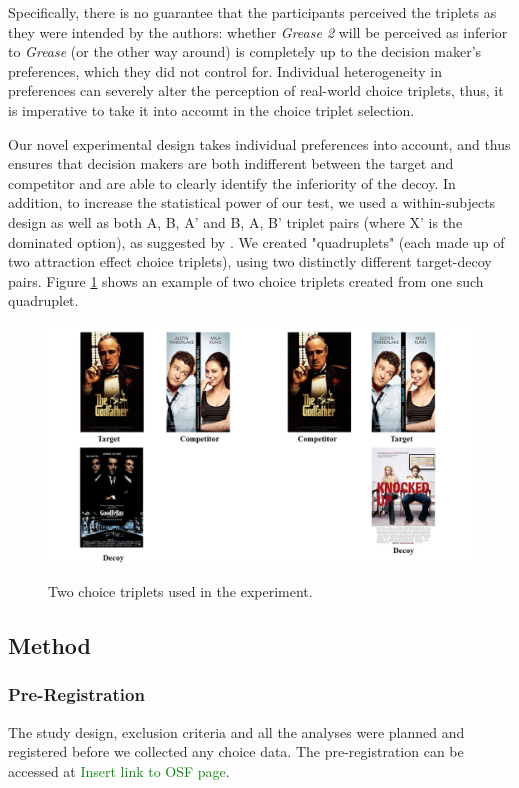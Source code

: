 \documentclass[12pt, a4paper]{article}
\newcommand{\NS}[1] {{\textcolor{green}{#1}}}
\begin{document}
Specifically, there is no guarantee that the participants perceived the triplets as they were intended by the authors: whether \textit{Grease 2} will be perceived as inferior to \textit{Grease} (or the other way around) is completely up to the decision maker's preferences, which they did not control for. Individual heterogeneity in preferences can severely alter the perception of real-world choice triplets, thus, it is imperative to take it into account in the choice triplet selection.

Our novel experimental design takes individual preferences into account, and thus ensures that decision makers are both indifferent between the target and competitor and are able to clearly identify the inferiority of the decoy. In addition, to increase the statistical power of our test, we used a within-subjects design as well as both A, B, A' and B, A, B' triplet pairs (where X' is the dominated option), as suggested by . We created "quadruplets" (each made up of two attraction effect choice triplets), using two distinctly different target-decoy pairs. Figure \ref{fig:quadruplets} shows an example of two choice triplets created from one such quadruplet.


 \begin{figure}
\centering
\captionsetup{justification=centering}
		 \caption{Two choice triplets used in the experiment.}
\includegraphics[width=1\textwidth]{figure1.jpg}
\label{fig:quadruplets}
\end{figure}

\subsection{Method}

\subsubsection{Pre-Registration}
The study design, exclusion criteria and all the analyses were planned and registered before we collected any choice data. The pre-registration can be accessed at \NS{Insert link to OSF page}.
\end{document}
